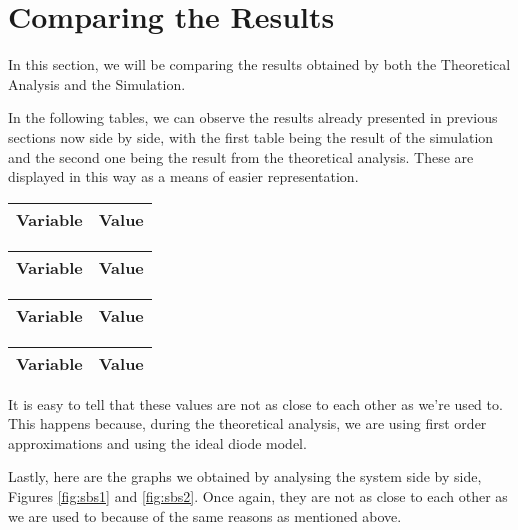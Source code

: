 \clearpage

\section{Comparing the Results}
\label{sec:comparing}

In this section, we will be comparing the results obtained by both the Theoretical Analysis and the Simulation.

In the following tables, we can observe the results already presented in previous sections now side by side, with the first table being the result of the simulation and the second one being the result from the theoretical analysis. These are displayed in this
way as a means of easier representation.

\begin{table}[htb!]
  \begin{tabular}{|l|r|}
      \hline    
      {\bf Variable} & {\bf Value} \\ \hline
      
  \end{tabular}
\quad
  \begin{tabular}{|l|r|}
    \hline    
    {\bf Variable} & {\bf Value} \\ \hline %
    
  \end{tabular}
\end{table}

\begin{table}[htb!]
  \begin{tabular}{|l|r|}
      \hline    
      {\bf Variable} & {\bf Value} \\ \hline
      
  \end{tabular}
\quad
  \begin{tabular}{|l|r|}
    \hline    
    {\bf Variable} & {\bf Value} \\ \hline %
    
  \end{tabular}
\end{table}

It is easy to tell that these values are not as close to each other as we're used to. This happens because, during the theoretical analysis, we are using first order approximations and using the ideal diode model.

\clearpage

Lastly, here are the graphs we obtained by analysing the system side by side, Figures \ref{fig:sbs1} and \ref{fig:sbs2}. Once again, they are not as close to each other as we are used to because of the same reasons as mentioned above.

